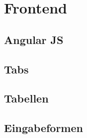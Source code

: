 \section{Frontend}

\subsection{Angular JS}

\subsection{Tabs}

\subsection{Tabellen}

\subsection{Eingabeformen}